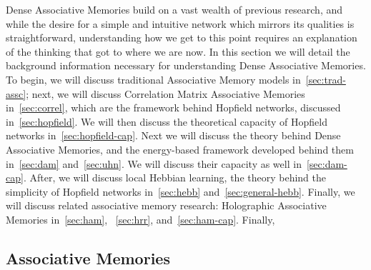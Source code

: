 \documentclass{article}
\theoremstyle{definition}
\begin{document}
Dense Associative Memories build on a vast wealth of previous research, and
while the desire for a simple and intuitive network which mirrors its qualities
is straightforward, understanding how we get to this point requires 
an explanation of the thinking that got to where we are now. In this section
we will detail the background information necessary for understanding Dense
Associative Memories. To begin, we will discuss traditional Associative Memory
models in~\autoref{sec:trad-assc}; next, we will discuss Correlation Matrix
Associative Memories in~\autoref{sec:correl}, which are the framework behind
Hopfield networks, discussed in~\autoref{sec:hopfield}. We will then discuss
the theoretical capacity of Hopfield networks in~\autoref{sec:hopfield-cap}.
Next we will discuss the theory behind Dense Associative Memories, and the 
energy-based framework developed behind them in~\autoref{sec:dam} 
and~\autoref{sec:uhn}. We will discuss their capacity as well 
in~\autoref{sec:dam-cap}. After, we will discuss local Hebbian learning,
the theory behind the simplicity of Hopfield networks in~\autoref{sec:hebb}
and~\autoref{sec:general-hebb}. Finally, we will discuss related associative
memory research: Holographic Associative Memories in~\autoref{sec:ham},~
\autoref{sec:hrr}, and~\autoref{sec:ham-cap}. Finally, 

\subsection{Associative Memories}\label{sec:trad-assc}
\end{document}
